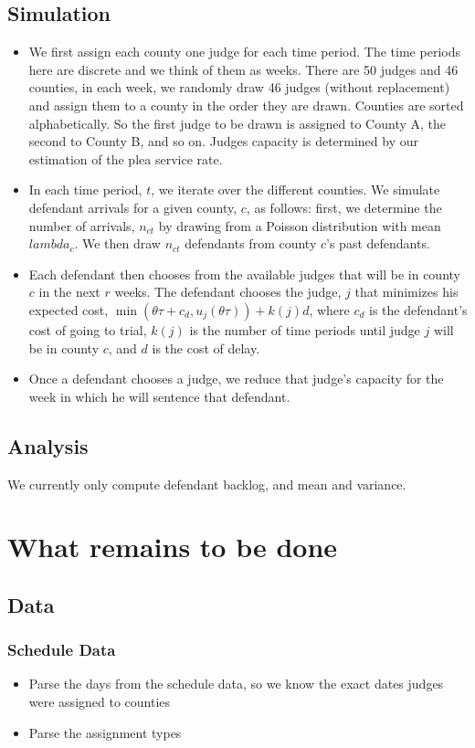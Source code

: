\documentclass[11pt]{article}
\begin{document}
  \subsection{Simulation}
    \begin{itemize}
      \item We first assign each county one judge for each time period. The time periods
      here are discrete and we think of them as weeks. There are 50 judges and 46 counties,
      in each week, we randomly draw 46 judges (without replacement) and assign them to a county in the order they are drawn. Counties are sorted alphabetically. So the first judge to be drawn is assigned to County A, the second to County B, and so on. Judges capacity is determined by our estimation of the plea service rate.
      \item In each time period, $t$, we iterate over the different counties. We simulate defendant arrivals for a given county, $c$, as follows: first, we determine the number of arrivals, $n_{ct}$ by drawing from a Poisson distribution with mean $lambda_c$. We then draw $n_{ct}$ defendants from county
      $c$'s past defendants.
      \item Each defendant then chooses from the available judges that will be in
      county $c$ in the next $r$ weeks. The defendant chooses the judge, $j$ that minimizes his expected cost, $\min(\theta \tau + c_d,u_j(\theta \tau)) + k(j)d$, where $c_d$ is the defendant's cost of going to trial, $k(j)$ is the
      number of time periods until judge $j$ will be in county $c$, and $d$ is the cost of delay.
      \item Once a defendant chooses a judge, we reduce that judge's capacity for the week in which he will sentence that defendant.
    \end{itemize}

  \subsection{Analysis}
    We currently only compute defendant backlog, and mean and variance.

\section{What remains to be done}
  \subsection{Data}
    \subsubsection{Schedule Data}
      \begin{itemize}
        \item Parse the days from the schedule data, so we know the exact dates judges were assigned to counties
        \item Parse the assignment types
      \end{itemize}
\end{document}
